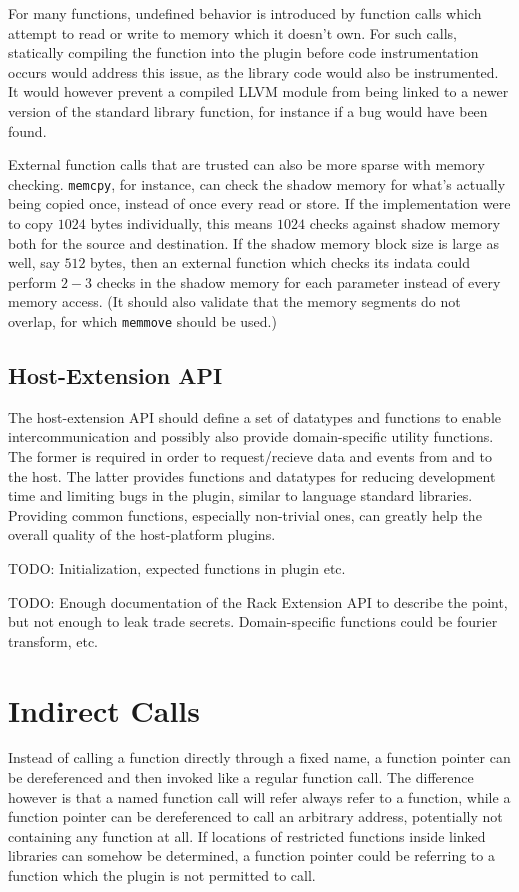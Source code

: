 For many functions, undefined behavior is introduced by function calls which
attempt to read or write to memory which it doesn't own. For such calls, 
statically compiling the function into the plugin before code instrumentation
occurs would address this issue, as the library code would also be instrumented.
It would however prevent a compiled LLVM module from being linked to a newer
version of the standard library function, for instance if a bug would have been
found.

External function calls that are trusted can also be more sparse with memory
checking. \texttt{memcpy}, for instance, can check the shadow memory for what's
actually being copied once, instead of once every read or store. If the
implementation were to copy $1024$ bytes individually, this means $1024$ checks
against shadow memory both for the source and destination. If the shadow memory
block size is large as well, say $512$ bytes, then an external function which
checks its indata could perform $2-3$ checks in the shadow memory for each
parameter instead of every memory access. (It should also validate that the
memory segments do not overlap, for which \texttt{memmove} should be used.)

\subsection {Host-Extension API}

The host-extension API should define a set of datatypes and functions to enable
intercommunication and possibly also provide domain-specific utility functions.
The former is required in order to request/recieve data and events from and to
the host. The latter provides functions and datatypes for reducing development
time and limiting bugs in the plugin, similar to language standard libraries.
Providing common functions, especially non-trivial ones, can greatly help the
overall quality of the host-platform plugins.

TODO: Initialization, expected functions in plugin etc.

TODO: Enough documentation of the Rack Extension API to describe the point, but
not enough to leak trade secrets. Domain-specific functions could be fourier
transform, etc.


\section {Indirect Calls}

Instead of calling a function directly through a fixed name, a function pointer
can be dereferenced and then invoked like a regular function call. The
difference however is that a named function call will refer always refer to a
function, while a function pointer can be dereferenced to call an arbitrary
address, potentially not containing any function at all. If locations of
restricted functions inside linked libraries can somehow be determined, a
function pointer could be referring to a function which the plugin is not
permitted to call.

